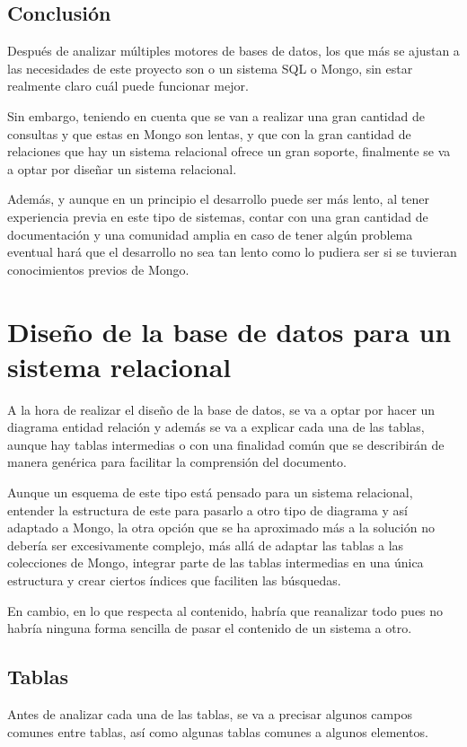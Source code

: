 \subsection{Conclusión}
Después de analizar múltiples motores de bases de datos, los que más se ajustan a las necesidades de este proyecto son o un sistema SQL o Mongo, sin estar realmente claro cuál puede funcionar mejor. 

Sin embargo, teniendo en cuenta que se van a realizar una gran cantidad de consultas y que estas en Mongo son lentas, y que con la gran cantidad de relaciones que hay un sistema relacional ofrece un gran soporte, finalmente se va a optar por diseñar un sistema relacional.

Además, y aunque en un principio el desarrollo puede ser más lento, al tener experiencia previa en este tipo de sistemas, contar con una gran cantidad de documentación y una comunidad amplia en caso de tener algún problema eventual hará que el desarrollo no sea tan lento como lo pudiera ser si se tuvieran conocimientos previos de Mongo. 


\section{Diseño de la base de datos para un sistema relacional}
A la hora de realizar el diseño de la base de datos, se va a optar por hacer un diagrama entidad relación y además se va a explicar cada una de las tablas, aunque hay tablas intermedias o con una finalidad común que se describirán de manera genérica para facilitar la comprensión del documento. 

Aunque un esquema de este tipo está pensado para un sistema relacional, entender la estructura de este para pasarlo a otro tipo de diagrama y así adaptado a Mongo, la otra opción que se ha aproximado más a la solución no debería ser excesivamente complejo, más allá de adaptar las tablas a las colecciones de Mongo, integrar parte de las tablas intermedias en una única estructura y crear ciertos índices que faciliten las búsquedas.

En cambio, en lo que respecta al contenido, habría que reanalizar todo pues no habría ninguna forma sencilla de pasar el contenido de un sistema a otro. 

\subsection{Tablas}
Antes de analizar cada una de las tablas, se va a precisar algunos campos comunes entre tablas, así como algunas tablas comunes a algunos elementos. 

